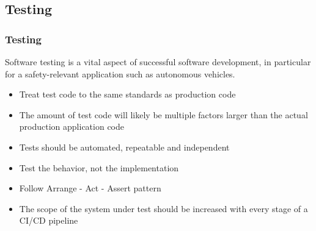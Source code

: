 \subsection{Testing}

\begin{frame}
\frametitle{Testing}
Software testing is a vital aspect of successful software development, in
particular for a safety-relevant application such as autonomous vehicles.

\begin{itemize}
    \item Treat test code to the same standards as production code
    \item The amount of test code will likely be multiple factors larger 
        than the actual production application code
    \item Tests should be automated, repeatable and independent
    \item Test the behavior, not the implementation
    \item Follow Arrange - Act - Assert pattern
    \item The scope of the system under test should be increased with every
        stage of a CI/CD pipeline
\end{itemize}
\end{frame}

